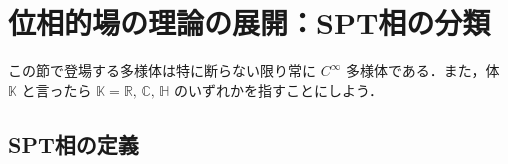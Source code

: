 \documentclass[TQFT_main]{subfiles}
\begin{document}
\setcounter{chapter}{3}

\chapter{位相的場の理論の展開：SPT相の分類}

この節で登場する多様体は特に断らない限り常に $C^\infty$ 多様体である．また，体 $\mathbb{K}$ と言ったら $\mathbb{K} = \mathbb{R},\, \mathbb{C},\, \mathbb{H}$ のいずれかを指すことにしよう．

\section{SPT相の定義}
\end{document}
